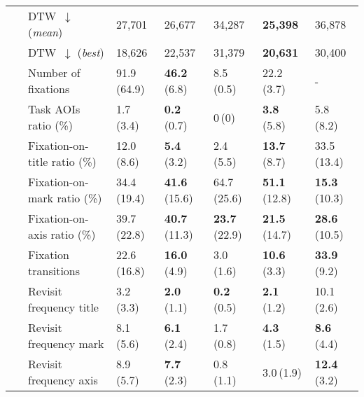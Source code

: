 \begin{table*}[htbp]
\begin{tabular}{cl p{15mm} p{15mm}p{15mm}p{15mm}p{15mm}}
& DTW~$\downarrow$ (\textit{mean}) & 27,701 & 26,677 & 34,287 & {\cellcolor{best}} \textbf{25,398} & 36,878 \\ %
& DTW~$\downarrow$ (\textit{best}) & 18,626 & 22,537 & 31,379 & {\cellcolor{best}} \textbf{20,631} & 30,400 \\ %
~ & Number of fixations        & 91.9\,(64.9) & {\cellcolor{best}} \textbf{46.2}\,(6.8) & 8.5\,(0.5) & 22.2\,(3.7) & -\\
~ & Task AOIs ratio (\%)       & 1.7\,(3.4) & {\cellcolor{best}} \textbf{0.2}\,(0.7) & 0\,(0) & {\cellcolor{good}} \textbf{3.8}\,(5.8) & 5.8\,(8.2)\\
~ & Fixation-on-title ratio (\%) & 12.0\,(8.6) & {\cellcolor{good}} \textbf{5.4}\,(3.2) & 2.4\,(5.5) & {\cellcolor{best}} \textbf{13.7}\,(8.7) & 33.5\,(13.4)\\
~ & Fixation-on-mark ratio (\%)  & 34.4\,(19.4) & {\cellcolor{best}} \textbf{41.6}\,(15.6) & 64.7\,(25.6) & {\cellcolor{good}} \textbf{51.1}\,(12.8) & {\cellcolor{good}} \textbf{15.3}\,(10.3)\\
~ & Fixation-on-axis ratio (\%)  & 39.7\,(22.8) & {\cellcolor{best}} \textbf{40.7}\,(11.3) & {\cellcolor{good}} \textbf{23.7}\,(22.9) & {\cellcolor{good}} \textbf{21.5}\,(14.7) & {\cellcolor{good}} \textbf{28.6}\,(10.5)\\
~ & Fixation transitions        & 22.6\,(16.8) & {\cellcolor{best}} \textbf{16.0}\,(4.9) & 3.0\,(1.6) & {\cellcolor{good}} \textbf{10.6}\,(3.3) & {\cellcolor{good}} \textbf{33.9}\,(9.2)\\
~ & Revisit frequency title     & 3.2\,(3.3) & {\cellcolor{good}} \textbf{2.0}\,(1.1) & {\cellcolor{good}} \textbf{0.2}\,(0.5) &{\cellcolor{best}} \textbf{2.1}\,(1.2) & 10.1\,(2.6)\\
~ & Revisit frequency mark      & 8.1\,(5.6) & {\cellcolor{good}} \textbf{6.1}\,(2.4) & 1.7\,(0.8) & {\cellcolor{good}} \textbf{4.3}\,(1.5) & {\cellcolor{best}} \textbf{8.6}\,(4.4)\\
~ & Revisit frequency axis      & 8.9\,(5.7) & {\cellcolor{best}} \textbf{7.7}\,(2.3) & 0.8\,(1.1) & 3.0\,(1.9) & {\cellcolor{good}} \textbf{12.4}\,(3.2)\\
\bottomrule
\end{tabular}
\vspace{5mm}
\label{tab:benchmark}
\end{table*}